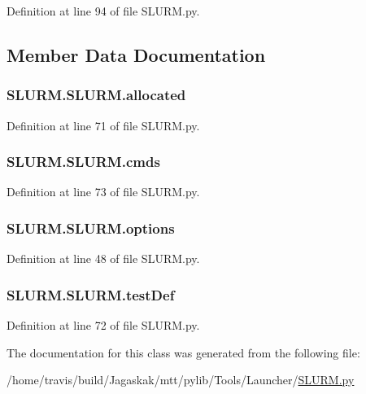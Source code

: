 Definition at line 94 of file S\-L\-U\-R\-M.\-py.



\subsection{Member Data Documentation}
\hypertarget{classSLURM_1_1SLURM_aee4130d6ff2007d08fad045aedd69781}{
\subsubsection[{allocated}]{\setlength{\rightskip}{0pt plus 5cm}S\-L\-U\-R\-M.\-S\-L\-U\-R\-M.\-allocated}}\label{classSLURM_1_1SLURM_aee4130d6ff2007d08fad045aedd69781}


Definition at line 71 of file S\-L\-U\-R\-M.\-py.

\hypertarget{classSLURM_1_1SLURM_ab755a940fd09c8fa416c177f692d31d6}{
\subsubsection[{cmds}]{\setlength{\rightskip}{0pt plus 5cm}S\-L\-U\-R\-M.\-S\-L\-U\-R\-M.\-cmds}}\label{classSLURM_1_1SLURM_ab755a940fd09c8fa416c177f692d31d6}


Definition at line 73 of file S\-L\-U\-R\-M.\-py.

\hypertarget{classSLURM_1_1SLURM_a652a43986b8bda5c6ddb866ab0513ac8}{
\subsubsection[{options}]{\setlength{\rightskip}{0pt plus 5cm}S\-L\-U\-R\-M.\-S\-L\-U\-R\-M.\-options}}\label{classSLURM_1_1SLURM_a652a43986b8bda5c6ddb866ab0513ac8}


Definition at line 48 of file S\-L\-U\-R\-M.\-py.

\hypertarget{classSLURM_1_1SLURM_a9b08ef79e039a8524f1fa6712b45182b}{
\subsubsection[{test\-Def}]{\setlength{\rightskip}{0pt plus 5cm}S\-L\-U\-R\-M.\-S\-L\-U\-R\-M.\-test\-Def}}\label{classSLURM_1_1SLURM_a9b08ef79e039a8524f1fa6712b45182b}


Definition at line 72 of file S\-L\-U\-R\-M.\-py.



The documentation for this class was generated from the following file\-:\begin{DoxyCompactItemize}
\item 
/home/travis/build/\-Jagaskak/mtt/pylib/\-Tools/\-Launcher/\hyperlink{SLURM_8py}{S\-L\-U\-R\-M.\-py}\end{DoxyCompactItemize}
